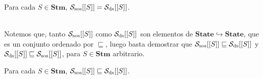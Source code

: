 \begin{theorem}
Para cada $S \in \mathbf{Stm}$, $\mathcal{S}_{\mathrm{sos}}[[S]] = \mathcal{S}_{\mathrm{ds}}[[S]]$.
\end{theorem}
\\

Notemos que, tanto $\mathcal{S}_{\mathrm{sos}}[[S]]$ como $\mathcal{S}_{\mathrm{ds}}[[S]]$ son elementos de $\mathbf{State}\hookrightarrow\mathbf{State}$, que es un conjunto ordenado por $\sqsubseteq$, luego basta demostrar que $\mathcal{S}_{\mathrm{sos}}[[S]] \sqsubseteq \mathcal{S}_{\mathrm{ds}}[[S]]$ y $\mathcal{S}_{\mathrm{ds}}[[S]] \sqsubseteq \mathcal{S}_{\mathrm{sos}}[[S]]$, para $S \in \mathbf{Stm}$ arbitrario.
\\

\begin{lema}
Para cada $S \in \mathbf{Stm}$, $\mathcal{S}_{\mathrm{sos}}[[S]]\sqsubseteq \mathcal{S}_{\mathrm{ds}}[[S]]$.
\end{lema}
